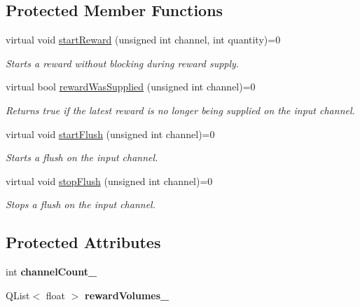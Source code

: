 \subsection*{Protected Member Functions}
\begin{DoxyCompactItemize}
\item 
virtual void \hyperlink{class_picto_1_1_reward_controller_a3e09bdba141632e89472bef42dc1e132}{start\-Reward} (unsigned int channel, int quantity)=0
\begin{DoxyCompactList}\small\item\em Starts a reward without blocking during reward supply. \end{DoxyCompactList}\item 
virtual bool \hyperlink{class_picto_1_1_reward_controller_a213ce91b8ef9019786e96e601d9641b9}{reward\-Was\-Supplied} (unsigned int channel)=0
\begin{DoxyCompactList}\small\item\em Returns true if the latest reward is no longer being supplied on the input channel. \end{DoxyCompactList}\item 
virtual void \hyperlink{class_picto_1_1_reward_controller_aaf880507edaa44288cd5b17bdb71f079}{start\-Flush} (unsigned int channel)=0
\begin{DoxyCompactList}\small\item\em Starts a flush on the input channel. \end{DoxyCompactList}\item 
virtual void \hyperlink{class_picto_1_1_reward_controller_a5a14b4f103def1711b485cc05f4c53bb}{stop\-Flush} (unsigned int channel)=0
\begin{DoxyCompactList}\small\item\em Stops a flush on the input channel. \end{DoxyCompactList}\end{DoxyCompactItemize}
\subsection*{Protected Attributes}
\begin{DoxyCompactItemize}
\item 
\hypertarget{class_picto_1_1_reward_controller_a51ce15bed088bb162c6d87f79bd64a59}{int {\bfseries channel\-Count\-\_\-}}\label{class_picto_1_1_reward_controller_a51ce15bed088bb162c6d87f79bd64a59}

\item 
\hypertarget{class_picto_1_1_reward_controller_ad6f932bbc885d692776095ce1f907593}{Q\-List$<$ float $>$ {\bfseries reward\-Volumes\-\_\-}}\label{class_picto_1_1_reward_controller_ad6f932bbc885d692776095ce1f907593}

\end{DoxyCompactItemize}


